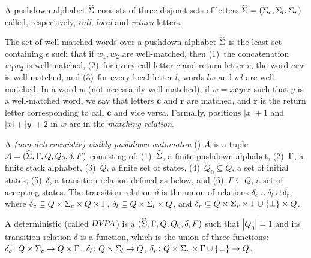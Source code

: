 A pushdown alphabet $\widehat{\Sigma}$ consists of three disjoint sets of letters $\widehat{\Sigma} = (\Sigma_c,\Sigma_l, \Sigma_r)$ called, respectively, 
\emph{call}, \emph{local} and \emph{return} letters.

\newcommand{\dCall}{\textbf{c}}
\newcommand{\dReturn}{\textbf{r}}
The set of well-matched words over a pushdown alphabet $\widehat{\Sigma}$ is the least set containing $\epsilon$ 
such that if $w_1, w_2$ are well-matched, then
(1)~the concatenation $w_1 w_2$ is well-matched, 
(2)~for every call letter $c$ and return letter $r$, the word $ c w r$ is well-matched, and
(3)~for every local letter $l$, words $lw$ and $wl$ are well-matched.
In a word $w$ (not necessarily well-matched), if $w = x \dCall y \dReturn z$ such that $y$ is a well-matched word, 
we say that letters $\dCall$ and $\dReturn$ are matched, and $\dReturn$ is the return letter corresponding to call $\dCall$ and vice versa. 
Formally, positions $|x|+1$ and $|x|+|y|+2$ in $w$ are in the \emph{matching relation}.

A \emph{(non-deterministic) visibly pushdown automaton} (\VPA) $\mathcal{A}$ is a tuple $\mathcal{A} = (\widehat{\Sigma}, \Gamma, Q, Q_0, \delta, F)$  consisting of:
(1)~$\widehat{\Sigma}$, a finite pushdown alphabet, 
(2)~$\Gamma$, a finite stack alphabet, 
(3)~$Q$, a finite set of states, 
(4)~$Q_0 \subseteq Q$, a set of initial states, 
(5)~$\delta$, a transition relation defined as below, and
(6)~$F \subseteq Q$, a set of accepting states.
The transition relation $\delta$ is the union of relations $\delta_c \cup \delta_l \cup \delta_r$, where
$\delta_c \subseteq Q \times \Sigma_c \times Q \times \Gamma$, 
$\delta_l \subseteq Q \times \Sigma_l \times Q$, and
$\delta_r \subseteq Q \times \Sigma_r \times \Gamma \cup \{\bot\} \times Q$.

A deterministic \VPA (called $\textsl{DVPA}$) is a \VPA $(\widehat{\Sigma}, \Gamma, Q, Q_0, \delta, F)$ such that $|Q_0| = 1$ and 
its transition relation $\delta$ is a function, which is the union of three functions:
$\delta_c \colon Q \times \Sigma_c \to Q \times \Gamma$, 
$\delta_l \colon Q \times \Sigma_l \to Q$,
$\delta_r \colon Q \times \Sigma_r \times \Gamma \cup \{\bot\} \to Q$.

